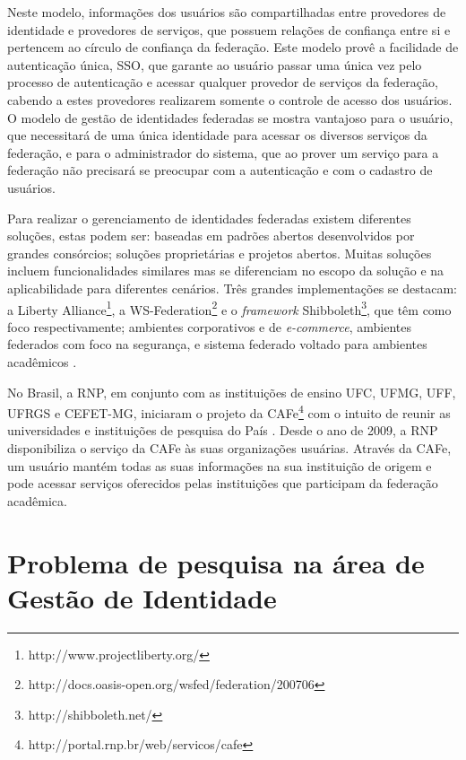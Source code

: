 Neste modelo, informações dos usuários são compartilhadas entre provedores de identidade e provedores de serviços, que possuem relações de confiança entre si e pertencem ao círculo de confiança da federação. Este modelo provê a facilidade de autenticação única, \ac{SSO}, que garante ao usuário passar uma única vez pelo processo de autenticação e acessar qualquer provedor de serviços da federação, cabendo a estes provedores realizarem somente o controle de acesso dos usuários. O modelo de gestão de identidades federadas se mostra vantajoso para o usuário, que necessitará de uma única identidade para acessar os diversos serviços da federação, e para o administrador do sistema, que ao prover um serviço para a federação não precisará se preocupar com a autenticação e com o cadastro de usuários.
	
Para realizar o gerenciamento de identidades federadas existem diferentes soluções, estas podem ser: baseadas em padrões abertos desenvolvidos por grandes consórcios; soluções proprietárias e projetos abertos. Muitas  soluções incluem funcionalidades similares mas se diferenciam no escopo da solução e na aplicabilidade para diferentes cenários. Três grandes implementações se destacam: a Liberty Alliance\footnote{http://www.projectliberty.org/}, a WS-Federation\footnote{http://docs.oasis-open.org/wsfed/federation/200706} e o \textit{framework} Shibboleth\footnote{http://shibboleth.net/}, que têm como foco respectivamente; ambientes corporativos e de \textit{e-commerce}, ambientes federados com foco na segurança, e sistema federado voltado para ambientes acadêmicos \cite{kallela:08}.
	
No Brasil, a \ac{RNP}, em conjunto com as instituições de ensino \acs{UFC}, \acs{UFMG}, \acs{UFF}, \acs{UFRGS} e \acs{CEFET-MG}, iniciaram o projeto da \ac{CAFe}\footnote{http://portal.rnp.br/web/servicos/cafe} com o intuito de reunir as universidades e instituições de pesquisa do País \cite{moreira:11}. Desde o ano de 2009, a \ac{RNP} disponibiliza o serviço da \ac{CAFe} às suas organizações usuárias. Através da \ac{CAFe}, um usuário mantém todas as suas informações na sua instituição de origem e pode acessar serviços oferecidos pelas instituições que participam da federação acadêmica.

\section{Problema de pesquisa na área de Gestão de Identidade}
\label{ci_s_problema}

